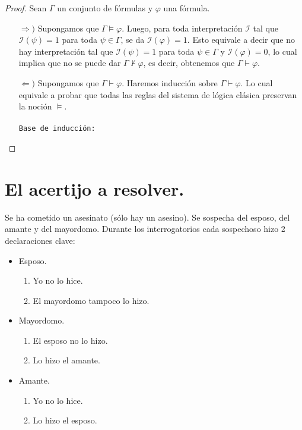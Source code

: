 \documentclass[letterpaper,12pt]{article}
\begin{document}
    \begin{proof}
        Sean $\Gamma$ un conjunto de fórmulas y $\varphi$ una fórmula.
        \begin{itemize}
            \item[$\Rightarrow )$] Supongamos que $\Gamma \models \varphi$.
            Luego, para toda interpretación $\mathcal{I}$ tal que 
            $\mathcal{I}(\psi) = 1$ para toda $\psi \in \Gamma$, se da
            $\mathcal{I}(\varphi) = 1$. Esto equivale a decir que no hay 
            interpretación tal que $\mathcal{I}(\psi) = 1$ para toda 
            $\psi \in \Gamma$ y $\mathcal{I}(\varphi) = 0$, lo cual 
            implica que no se puede dar $\Gamma \not \vdash \varphi$, 
            es decir, obtenemos que $\Gamma \vdash \varphi$.

            \item[$\Leftarrow )$] Supongamos que $\Gamma \vdash \varphi$.
            Haremos inducción sobre $\Gamma \vdash \varphi$. Lo cual 
            equivale a probar que todas las reglas del sistema de lógica 
            clásica preservan la noción $\models$. \\ \\
            \texttt{Base de inducción:}
        \end{itemize}
    \end{proof}

    \section{El acertijo a resolver.}
    Se ha cometido un asesinato (sólo hay un asesino). Se sospecha del esposo,
    del amante y del mayordomo. Durante los interrogatorios cada sospechoso 
    hizo 2 declaraciones clave:
    \begin{itemize}
        \item Esposo.
        \begin{enumerate}
            \item Yo no lo hice.
            \item El mayordomo tampoco lo hizo.
        \end{enumerate}
        \item Mayordomo.
        \begin{enumerate}
            \item El esposo no lo hizo.
            \item Lo hizo el amante.
        \end{enumerate}
        \item Amante.
        \begin{enumerate}
            \item Yo no lo hice.
            \item Lo hizo el esposo.
        \end{enumerate}
    \end{itemize}
\end{document}
